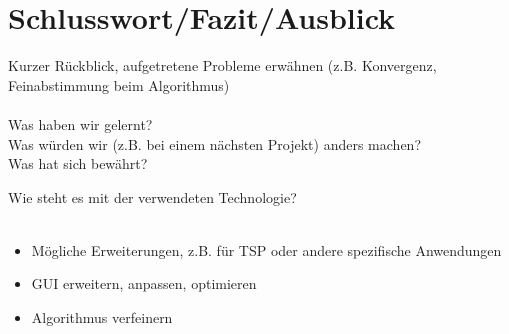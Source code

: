 
\chapter{Schlusswort/Fazit/Ausblick}


Kurzer Rückblick, aufgetretene Probleme erwähnen (z.B. Konvergenz, Feinabstimmung beim Algorithmus) \\\\


Was haben wir gelernt? \\

Was würden wir (z.B. bei einem nächsten Projekt) anders machen? \\

Was hat sich bewährt?

Wie steht es mit der verwendeten Technologie? \\\\




\begin{itemize}
\item Mögliche Erweiterungen, z.B. für TSP oder andere spezifische Anwendungen
\item GUI erweitern, anpassen, optimieren
\item Algorithmus verfeinern
\end{itemize}


